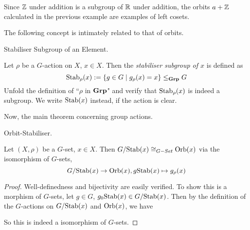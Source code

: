 \documentclass[../../book.tex]{subfiles}
\begin{document}
\begin{eg}
    
    Since $\mathbb{Z}$ under addition is a subgroup of $\mathbb{R}$ under addition,
    the orbits $a + \mathbb{Z}$ calculated in the previous example
    are examples of left cosets. 
    
\end{eg}

The following concept is intimately related to that of orbits. 

\begin{dfn} Stabiliser Subgroup of an Element. 

    Let $\rho$ be a $G$-action on $X$, $x \in X$. 
    Then the \emph{stabiliser subgroup of $x$} is defined as
    \[
        \mathrm{Stab}_\rho(x) := \{g \in G \mid g_\rho(x) = x\} \leq_{\mathbf{Grp}} G
    \]
    Unfold the definition of ``$\rho$ in $\mathbf{Grp}$" and verify that 
    $\mathrm{Stab}_\rho(x)$ is indeed a subgroup. 
    We write $\mathrm{Stab}(x)$ instead, if the action is clear. 

\end{dfn}
Now, the main theorem concerning group actions. 
\begin{thm} Orbit-Stabiliser. 
    
    Let $(X,\rho)$ be a $G$-set, $x \in X$.
    Then $G / \mathrm{Stab}(x) \cong_{G-Set} \mathrm{Orb}(x)$ via the isomorphism of $G$-sets, 
    \[
        G / \mathrm{Stab}(x) \to \mathrm{Orb}(x), g\mathrm{Stab}(x) \mapsto g_\rho(x)
    \]
\end{thm}
\begin{proof}
    Well-definedness and bijectivity are easily verified. 
    To show this is a morphism of $G$-sets, 
    let $g \in G$, $g_0\mathrm{Stab}(x) \in G / \mathrm{Stab}(x)$. 
    Then by the definition of the $G$-actions on $G/\mathrm{Stab}(x)$ and $\mathrm{Orb}(x)$, 
    we have 
    \begin{figure}[ht]
        \centering
    \end{figure}
    
    So this is indeed a isomorphism of $G$-sets. 
\end{proof}
\end{document}
